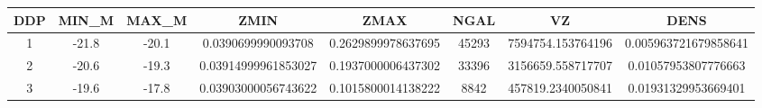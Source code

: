 \begin{table}
\begin{tabular}{cccccccc}
\hline \hline
DDP & MIN_M & MAX_M & ZMIN & ZMAX & NGAL & VZ & DENS \\
\hline
1 & -21.8 & -20.1 & 0.0390699990093708 & 0.2629899978637695 & 45293 & 7594754.153764196 & 0.005963721679858641 \\
2 & -20.6 & -19.3 & 0.03914999961853027 & 0.1937000006437302 & 33396 & 3156659.558717707 & 0.01057953807776663 \\
3 & -19.6 & -17.8 & 0.03903000056743622 & 0.1015800014138222 & 8842 & 457819.2340050841 & 0.01931329953669401 \\
\hline
\end{tabular}
\end{table}
